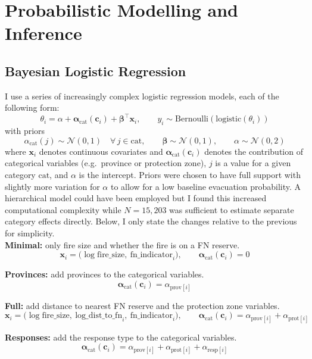 \section{Probabilistic Modelling and Inference}\label{sec:modelling}
\subsection{Bayesian Logistic Regression}\label{sec:first_model}
I use a series of increasingly complex logistic regression models, each of the following form:
\[
\theta_i
=
\alpha
+ \mathbf{\alpha}_{\mathrm{cat}}(\mathbf{c}_i)
+ \boldsymbol{\beta}^\top \mathbf{x}_i,
\qquad
y_i \sim \mathrm{Bernoulli}\!\left(\mathrm{logistic}(\theta_i)\right)
\]
with priors
\[
\alpha_{\mathrm{cat}}(j) \sim \mathcal{N}(0,1) \quad \forall \, j\in \mathrm{cat}, \qquad 
\boldsymbol{\beta} \sim \mathcal{N}(0,1), \qquad
\alpha \sim \mathcal{N}(0,2)
\]
where \(\mathbf{x}_i\) denotes continuous covariates and \(\mathbf{\alpha}_{\mathrm{cat}}(\mathbf{c}_i)\) denotes the contribution of categorical variables (e.g.\ province or protection zone), $j$ is a value for a given category $\mathrm{cat}$, and $\alpha$ is the intercept. Priors were chosen to have full support with slightly more variation for $\alpha$ to allow for a low baseline evacuation probability. A hierarchical model could have been employed but I found this increased computational complexity while $N=15,203$ was sufficient to estimate separate category effects directly. Below, I only state the changes relative to the previous for simplicity.\\
\textbf{Minimal:} only fire size and whether the fire is on a FN reserve.
\[
\mathbf{x}_i = \big(\log \text{fire\_size},\ \text{fn\_indicator}_i\big),
\qquad
\mathbf{\alpha}_{\mathrm{cat}}(\mathbf{c}_i) = 0
\]

\textbf{Provinces:} add provinces to the categorical variables.
\[
\mathbf{\alpha}_{\mathrm{cat}}(\mathbf{c}_i) = \alpha_{\mathrm{prov}[i]}
\]

\textbf{Full:} add distance to nearest FN reserve and the protection zone variables.
\[
\mathbf{x}_i = \big(\log \text{fire\_size},\ \text{log\_dist\_to\_fn}_i,\ \text{fn\_indicator}_i\big),
\qquad
\mathbf{\alpha}_{\mathrm{cat}}(\mathbf{c}_i)
=
\alpha_{\mathrm{prov}[i]} + \alpha_{\mathrm{prot}[i]}
\]

\textbf{Responses:} add the response type to the categorical variables.
\[
\mathbf{\alpha}_{\mathrm{cat}}(\mathbf{c}_i)
=
\alpha_{\mathrm{prov}[i]} + \alpha_{\mathrm{prot}[i]} + \alpha_{\mathrm{resp}[i]}
\]

